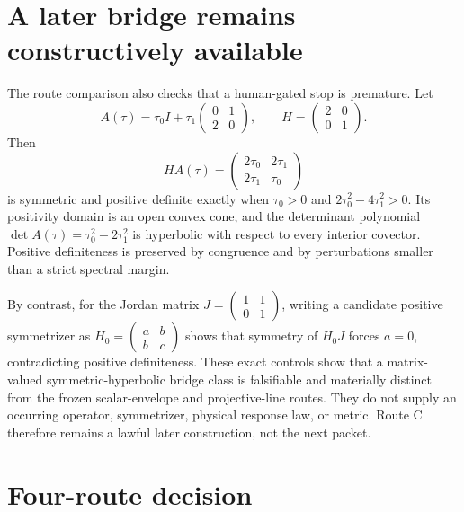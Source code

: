 \documentclass[11pt]{article}
\begin{document}
\section{A later bridge remains constructively available}

The route comparison also checks that a human-gated stop is premature.  Let
\[
 A(\tau)=\tau_0 I+\tau_1
 \begin{pmatrix}0&1\\2&0\end{pmatrix},
 \qquad H=\begin{pmatrix}2&0\\0&1\end{pmatrix}.
\]
Then
\[
 HA(\tau)=\begin{pmatrix}2\tau_0&2\tau_1\\
 2\tau_1&\tau_0\end{pmatrix}
\]
is symmetric and positive definite exactly when
$\tau_0>0$ and $2\tau_0^2-4\tau_1^2>0$.  Its positivity domain is an open
convex cone, and the determinant polynomial
$\det A(\tau)=\tau_0^2-2\tau_1^2$ is hyperbolic with respect to every
interior covector.  Positive definiteness is preserved by congruence and by
perturbations smaller than a strict spectral margin.

By contrast, for the Jordan matrix
$J=\left(\begin{smallmatrix}1&1\\0&1\end{smallmatrix}\right)$, writing a
candidate positive symmetrizer as
$H_0=\left(\begin{smallmatrix}a&b\\b&c\end{smallmatrix}\right)$ shows that
symmetry of $H_0J$ forces $a=0$, contradicting positive definiteness.  These
exact controls show that a matrix-valued symmetric-hyperbolic bridge class is
falsifiable and materially distinct from the frozen scalar-envelope and
projective-line routes.  They do not supply an occurring operator,
symmetrizer, physical response law, or metric.  Route C therefore remains a
lawful later construction, not the next packet.

\section{Four-route decision}
\end{document}
